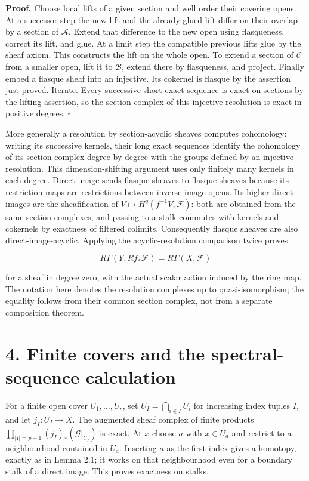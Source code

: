 \documentclass[11pt,a4paper,openany]{report}
\begin{document}
\textbf{Proof.} Choose local lifts of a given section and well order their covering opens. At a successor step the new lift and the already glued lift differ on their overlap by a section of \(\mathcal A\). Extend that difference to the new open using flasqueness, correct its lift, and glue. At a limit step the compatible previous lifts glue by the sheaf axiom. This constructs the lift on the whole open. To extend a section of \(\mathcal C\) from a smaller open, lift it to \(\mathcal B\), extend there by flasqueness, and project. Finally embed a flasque sheaf into an injective. Its cokernel is flasque by the assertion just proved. Iterate. Every successive short exact sequence is exact on sections by the lifting assertion, so the section complex of this injective resolution is exact in positive degrees. \(\square\)

More generally a resolution by section-acyclic sheaves computes cohomology: writing its successive kernels, their long exact sequences identify the cohomology of its section complex degree by degree with the groups defined by an injective resolution. This dimension-shifting argument uses only finitely many kernels in each degree. Direct image sends flasque sheaves to flasque sheaves because its restriction maps are restrictions between inverse-image opens. Its higher direct images are the sheafification of \(V\mapsto H^q(f^{-1}V,\mathcal F)\): both are obtained from the same section complexes, and passing to a stalk commutes with kernels and cokernels by exactness of filtered colimits. Consequently flasque sheaves are also direct-image-acyclic. Applying the acyclic-resolution comparison twice proves

\[
R\Gamma(Y,Rf_*\mathcal F)=R\Gamma(X,\mathcal F)
\]

for a sheaf in degree zero, with the actual scalar action induced by the ring map. The notation here denotes the resolution complexes up to quasi-isomorphism; the equality follows from their common section complex, not from a separate composition theorem.

\section{4. Finite covers and the spectral-sequence calculation}\label{AG-RG-S01-finite-covers-and-the-spectral-sequence-calculation}

For a finite open cover \(U_1,\ldots,U_r\), set \(U_I=\bigcap_{i\in I}U_i\) for increasing index tuples \(I\), and let \(j_I:U_I\to X\). The augmented sheaf complex of finite products \(\prod_{|I|=p+1}(j_I)_*(\mathcal G|_{U_I})\) is exact. At \(x\) choose \(a\) with \(x\in U_a\) and restrict to a neighbourhood contained in \(U_a\). Inserting \(a\) as the first index gives a homotopy, exactly as in Lemma 2.1; it works on that neighbourhood even for a boundary stalk of a direct image. This proves exactness on stalks.
\end{document}
